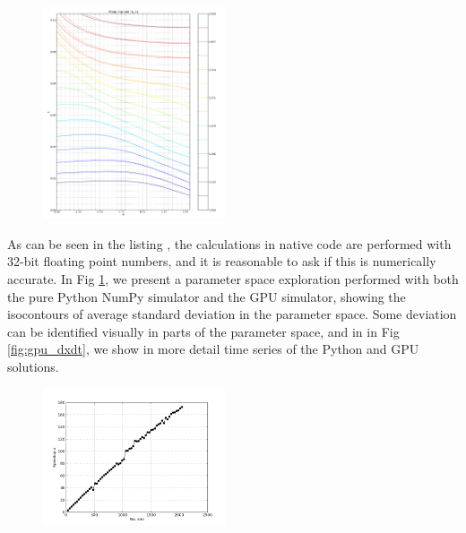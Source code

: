 	 \begin{figure}
		{\includegraphics[width=0.48\textwidth]{images/gpu_pse.png}}
		\caption{}
		\label{fig:gpu_pse}
	\end{figure}




	As can be seen in the listing , the calculations
	in native code are performed with 32-bit floating point numbers, and it
	is reasonable to ask if this is numerically accurate. In Fig 
	\ref{fig:gpu_pse}, we present a parameter space exploration performed with
	both the pure Python NumPy simulator and the GPU simulator, showing the 
	isocontours of average standard deviation in the parameter space. Some
	deviation can be identified visually in parts of the parameter space, and
	in in Fig \ref{fig:gpu_dxdt}, we show in more detail time series of 
	the Python and GPU solutions.

	 \begin{figure}
		{\includegraphics[width=0.48\textwidth]{images/gpu_acceleration.png}}
		\caption{}
		\label{fig:gpu_acceleration}
	\end{figure}

